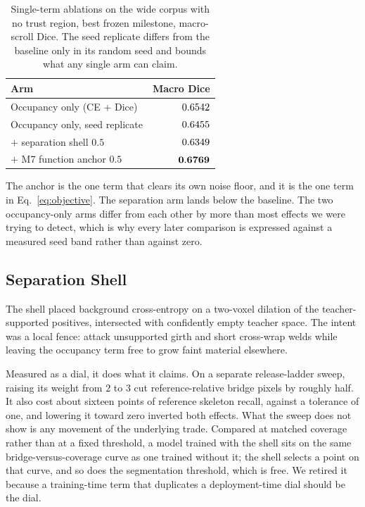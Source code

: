 \begin{table}[t]
\caption{Single-term ablations on the wide corpus with no trust region, best
frozen milestone, macro-scroll Dice. The seed replicate differs from the
baseline only in its random seed and bounds what any single arm can claim.}
\label{tab:ablation}
\centering
\small
\begin{tabular}{lr}
\toprule
Arm & Macro Dice \\
\midrule
Occupancy only (CE + Dice) & $0.6542$ \\
Occupancy only, seed replicate & $0.6455$ \\
\midrule
$+$ separation shell $0.5$ & $0.6349$ \\
$+$ M7 function anchor $0.5$ & $\mathbf{0.6769}$ \\
\bottomrule
\end{tabular}
\end{table}

The anchor is the one term that clears its own noise floor, and it is the one
term in Eq.~\ref{eq:objective}.
The separation arm lands below the baseline.
The two occupancy-only arms differ from each other by more than most effects we
were trying to detect, which is why every later comparison is expressed against
a measured seed band rather than against zero.

\subsection{Separation Shell}
\label{sec:also-separation}

The shell placed background cross-entropy on a two-voxel dilation of the
teacher-supported positives, intersected with confidently empty teacher space.
The intent was a local fence: attack unsupported girth and short cross-wrap
welds while leaving the occupancy term free to grow faint material elsewhere.

Measured as a dial, it does what it claims.
On a separate release-ladder sweep, raising its weight from $2$ to $3$ cut
reference-relative bridge pixels by roughly half.
It also cost about sixteen points of reference skeleton recall, against a
tolerance of one, and lowering it toward zero inverted both effects.
What the sweep does not show is any movement of the underlying trade.
Compared at matched coverage rather than at a fixed threshold, a model trained
with the shell sits on the same bridge-versus-coverage curve as one trained
without it; the shell selects a point on that curve, and so does the
segmentation threshold, which is free.
We retired it because a training-time term that duplicates a deployment-time
dial should be the dial.

